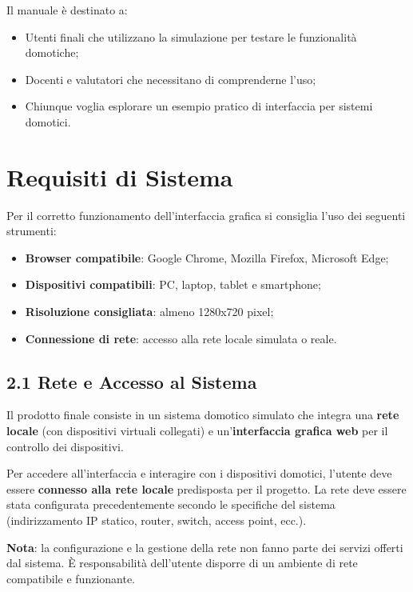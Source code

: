 \documentclass[a4paper,12pt]{article}
\begin{document}
Il manuale è destinato a:
\begin{itemize}
  \item Utenti finali che utilizzano la simulazione per testare le funzionalità domotiche;
  \item Docenti e valutatori che necessitano di comprenderne l’uso;
  \item Chiunque voglia esplorare un esempio pratico di interfaccia per sistemi domotici.
\end{itemize}

\section{Requisiti di Sistema}

Per il corretto funzionamento dell’interfaccia grafica si consiglia l’uso dei seguenti strumenti:

\begin{itemize}
  \item \textbf{Browser compatibile}: Google Chrome, Mozilla Firefox, Microsoft Edge;
  \item \textbf{Dispositivi compatibili}: PC, laptop, tablet e smartphone;
  \item \textbf{Risoluzione consigliata}: almeno 1280x720 pixel;
  \item \textbf{Connessione di rete}: accesso alla rete locale simulata o reale.
\end{itemize}

\subsection*{2.1 Rete e Accesso al Sistema}

Il prodotto finale consiste in un sistema domotico simulato che integra una \textbf{rete locale} (con dispositivi virtuali collegati) e un’\textbf{interfaccia grafica web} per il controllo dei dispositivi.

Per accedere all’interfaccia e interagire con i dispositivi domotici, l’utente deve essere \textbf{connesso alla rete locale} predisposta per il progetto. La rete deve essere stata configurata precedentemente secondo le specifiche del sistema (indirizzamento IP statico, router, switch, access point, ecc.).

\textbf{Nota}: la configurazione e la gestione della rete non fanno parte dei servizi offerti dal sistema. È responsabilità dell’utente disporre di un ambiente di rete compatibile e funzionante.
\end{document}
